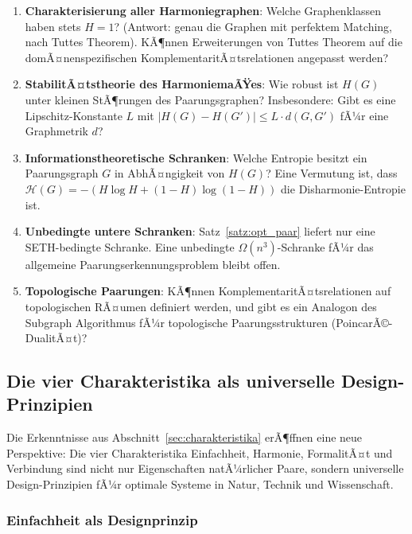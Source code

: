 ﻿\documentclass[a4paper,12pt]{article}
\theoremstyle{definition}
\begin{document}
\begin{enumerate}
	\item \textbf{Charakterisierung aller Harmoniegraphen}: Welche Graphenklassen
	haben stets $H = 1$? (Antwort: genau die Graphen mit perfektem Matching, nach
	Tuttes Theorem). KÃ¶nnen Erweiterungen von Tuttes Theorem auf die domÃ¤nenspezifischen
	KomplementaritÃ¤tsrelationen angepasst werden?
	
	\item \textbf{StabilitÃ¤tstheorie des HarmoniemaÃŸes}: Wie robust ist $H(G)$ unter
	kleinen StÃ¶rungen des Paarungsgraphen? Insbesondere: Gibt es eine Lipschitz-Konstante
	$L$ mit $|H(G) - H(G')| \leq L \cdot d(G, G')$ fÃ¼r eine Graphmetrik $d$?
	
	\item \textbf{Informationstheoretische Schranken}: Welche Entropie besitzt ein
	Paarungsgraph $G$ in AbhÃ¤ngigkeit von $H(G)$? Eine Vermutung ist, dass
	$\mathcal{H}(G) = -(H\log H + (1-H)\log(1-H))$ die Disharmonie-Entropie ist.
	
	\item \textbf{Unbedingte untere Schranken}: Satz~\ref{satz:opt_paar} liefert nur
	eine SETH-bedingte Schranke. Eine unbedingte $\Omega(n^3)$-Schranke fÃ¼r das
	allgemeine Paarungserkennungsproblem bleibt offen.
	
	\item \textbf{Topologische Paarungen}: KÃ¶nnen KomplementaritÃ¤tsrelationen auf
	topologischen RÃ¤umen definiert werden, und gibt es ein Analogon des
	Subgraph Algorithmus fÃ¼r topologische Paarungsstrukturen (PoincarÃ©-DualitÃ¤t)?
\end{enumerate}


\subsection{Die vier Charakteristika als universelle Design-Prinzipien}
\label{subsec:design}

Die Erkenntnisse aus Abschnitt~\ref{sec:charakteristika} erÃ¶ffnen eine neue Perspektive:
Die vier Charakteristika Einfachheit, Harmonie, FormalitÃ¤t und Verbindung sind nicht nur
Eigenschaften natÃ¼rlicher Paare, sondern universelle Design-Prinzipien fÃ¼r optimale Systeme
in Natur, Technik und Wissenschaft.

\subsubsection*{Einfachheit als Designprinzip}
\end{document}
